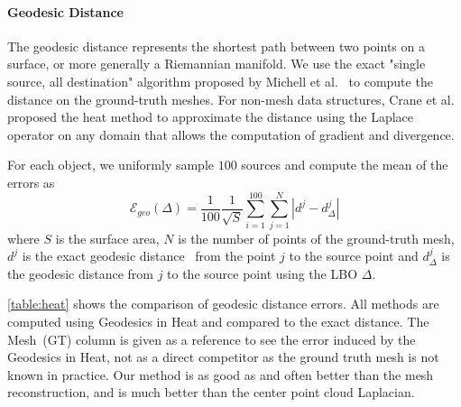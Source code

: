 \paragraph{Geodesic Distance}\label{sub:exp:heatandgeo}
The geodesic distance represents the shortest path between two points on a surface, or more generally a Riemannian manifold. We use the exact "single source, all destination" algorithm proposed by Michell et al.~\cite{mitchell1987discrete} to compute the distance on the ground-truth meshes. 
For non-mesh data structures, Crane et al.\cite{crane2017heat} proposed the heat method to approximate the distance using the Laplace operator on any domain that allows the computation of gradient and divergence.

For each object, we uniformly sample $100$ sources and compute the mean of the errors as $$\mathcal{E}_{geo}(\Delta) = \frac{1}{100}\frac{1}{\sqrt{S}}\sum_{i=1}^{100} \sum_{j=1}^N|d^j - d_{\Delta}^j|$$ where $S$ is the surface area, $N$ is the number of points of the ground-truth mesh, $d^j$ is the exact geodesic distance~\cite{mitchell1987discrete} from the point $j$ to the source point and $d_{\Delta}^j$ is the geodesic distance from $j$ to the source point using the LBO $\Delta$.

\cref{table:heat} shows the comparison of geodesic distance errors. All methods are computed using Geodesics in Heat and compared to the exact distance. The Mesh~(GT) column is given as a reference to see the error induced by the Geodesics in Heat, not as a direct competitor as the ground truth mesh is not known in practice. Our method is as good as and often better than the mesh reconstruction, and is much better than the center point cloud Laplacian. 


